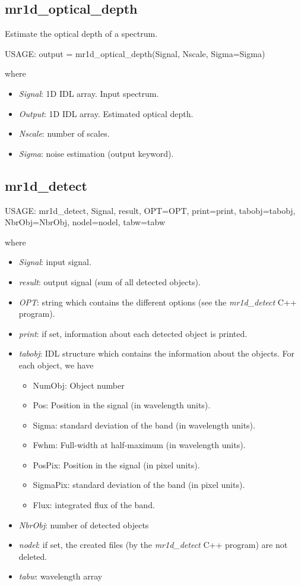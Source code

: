 \subsection{mr1d\_optical\_depth}
Estimate the optical depth of a spectrum.
{\bf
\begin{center}
     USAGE: output = mr1d\_optical\_depth(Signal, Nscale, Sigma=Sigma)
\end{center}}
where 
\begin{itemize}
\item {\em Signal}: 1D IDL array. Input spectrum.
\item {\em Output}: 1D IDL array. Estimated optical depth.
\item {\em Nscale}: number of scales.
\item {\em Sigma}: noise estimation (output keyword).
\end{itemize}

\subsection{mr1d\_detect}
{\bf
\begin{center}
     USAGE: mr1d\_detect, Signal, result, OPT=OPT, print=print, tabobj=tabobj, 
    NbrObj=NbrObj, nodel=nodel, tabw=tabw
\end{center}}
where
\begin{itemize}
\item {\em Signal}: input signal.
\item {\em result}: output signal (sum of all detected objects).
\item {\em OPT}: string which contains the different options 
(see the {\em mr1d\_detect} C++  program).
\item {\em print}: if set, information about each detected object is printed.
\item {\em tabobj}: IDL structure which contains the information about 
the objects. For each object, we have
\begin{itemize}
\item NumObj: Object number 
\item Pos: Position in the signal (in wavelength units). 
\item Sigma: standard deviation of the band (in wavelength units).
\item Fwhm:  Full-width at half-maximum (in wavelength units).
\item PosPix: Position in the signal (in pixel units).
\item SigmaPix: standard deviation of the band (in pixel units).
\item Flux:  integrated flux of the band.
\end{itemize}
\item {\em NbrObj}: number of detected objects
\item {\em nodel}: if set, the created files 
(by the {\em mr1d\_detect} C++ program)
are not deleted.
\item {\em tabw}:  wavelength array
\end{itemize}



